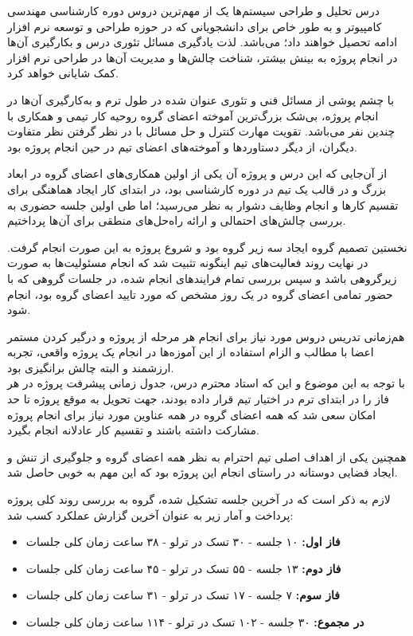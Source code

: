 \documentclass[12pt]{article}
\begin{document}
	درس تحلیل و طراحی سیستم‌ها یک از مهم‌ترین دروس دوره کارشناسی مهندسی کامپیوتر و به طور خاص برای دانشجویانی که در حوزه طراحی و توسعه نرم افزار ادامه تحصیل خواهند داد؛ می‌باشد. لذت یادگیری مسائل تئوری درس و بکارگیری آن‌ها در انجام پروژه به بینش بیشتر، شناخت چالش‌ها و مدیریت آن‌ها در طراحی نرم افزار کمک شایانی خواهد کرد.

	با چشم پوشی از مسائل فنی و تئوری عنوان شده در طول ترم و به‌کارگیری آن‌ها در انجام پروژه، بی‌شک بزرگ‌ترین آموخته اعضای گروه روحیه کار تیمی و همکاری با چندین نفر می‌باشد. تقویت مهارت کنترل و حل مسائل با در نظر گرفتن نظر متفاوت دیگران، از دیگر دستاوردها و آموخته‌های اعضای تیم در حین انجام پروژه بود.

	از آن‌جایی که این درس و پروژه آن یکی از اولین همکاری‌های اعضای گروه در ابعاد بزرگ و در قالب یک تیم در دوره کارشناسی بود، در ابتدای کار ایجاد هماهنگی برای تقسیم کارها و انجام وظایف دشوار به نظر می‌رسید؛ اما طی اولین جلسه حضوری به بررسی چالش‌های احتمالی و ارائه راه‌حل‌های منطقی برای آن‌ها پرداختیم.

	نخستین تصمیم گروه ایجاد سه زیر گروه بود و شروع پروژه به این صورت انجام گرفت. در نهایت روند فعالیت‌های تیم اینگونه تثبیت شد که انجام مسئولیت‌ها به صورت زیرگروهی باشد و سپس بررسی تمام فرایند‌های انجام شده، در جلسات گروهی که با حضور تمامی اعضای گروه در یک روز مشخص که مورد تایید اعضای گروه بود، انجام شود.

	هم‌زمانی تدریس دروس مورد نیاز برای انجام هر مرحله از پروژه و درگیر کردن مستمر اعضا با مطالب و الزام استفاده از این آموزه‌ها در انجام یک پروژه واقعی، تجربه ارزشمند و البته چالش برانگیزی بود.\\
	با توجه به این موضوع و این که استاد محترم درس، جدول زمانی پیشرفت پروژه در هر فاز را در ابتدای ترم در اختیار تیم قرار داده بودند، جهت تحویل به موقع پروژه تا حد امکان سعی شد که همه اعضای گروه در همه عناوین مورد نیاز برای انجام پروژه مشارکت داشته باشند و تقسیم کار عادلانه انجام بگیرد.

	همچنین یکی از اهداف اصلی تیم احترام به نظر همه اعضای گروه و جلوگیری از تنش و ایجاد فضایی دوستانه در راستای انجام این پروژه بود که این مهم به خوبی حاصل شد.

	لازم به ذکر است که در آخرین جلسه تشکیل شده، گروه به بررسی روند کلی پروژه پرداخت و آمار زیر به عنوان آخرین گزارش عملکرد کسب شد:
	\begin{itemize}
		\item
		\textbf{فاز اول:} ۱۰ جلسه - ۳۰ تسک در ترلو - ۳۸ ساعت زمان کلی جلسات
		\item
		\textbf{فاز دوم:} ۱۳ جلسه - ۵۵ تسک در ترلو - ۴۵ ساعت زمان کلی جلسات
		\item
		\textbf{فاز سوم:} ۷ جلسه - ۱۷ تسک در ترلو - ۳۱ ساعت زمان کلی جلسات
		\item
		\textbf{در مجموع:} ۳۰ جلسه - ۱۰۲ تسک در ترلو - ۱۱۴ ساعت زمان کلی جلسات

	\end{itemize}
\end{document}
